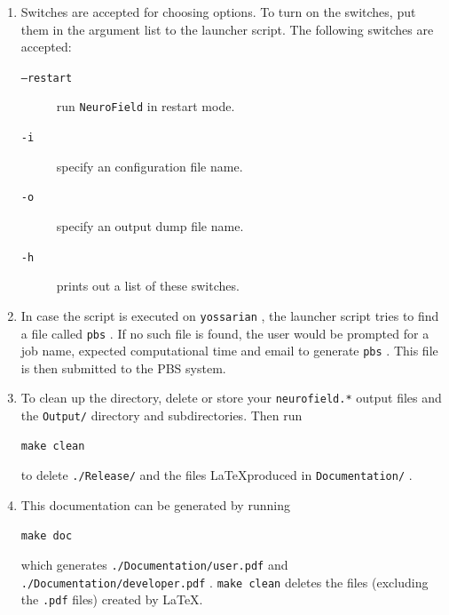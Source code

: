 \documentclass[12pt,a4paper]{article}
\newcommand{\type}[1]{ {\small\small\tt #1} }
\newcommand{\NF}[0]{ \type{NeuroField}}
\begin{document}
\begin{enumerate}
\item Switches are accepted for choosing options. To turn on the switches, put them in the argument list to the launcher script. The following switches are accepted:
	\begin{description}
	\item[\type{--restart}] run \NF in restart mode.
	\item[\type{-i}] specify an configuration file name.
	\item[\type{-o}] specify an output dump file name.
	\item[\type{-h}] prints out a list of these switches.
	\end{description}

\item In case the script is executed on \type{yossarian}, the launcher script tries to find a file called \type{pbs}. If no such file is found, the user would be prompted for a job name, expected computational time and email to generate \type{pbs}. This file is then submitted to the PBS system.

\item To clean up the directory, delete or store your \type{neurofield.*} output files and the \type{Output/} directory and subdirectories. Then run
\begin{lstlisting}
make clean
\end{lstlisting}
to delete \type{./Release/} and the files \LaTeX produced in \type{Documentation/}.

\item This documentation can be generated by running 
\begin{lstlisting}
make doc
\end{lstlisting}
which generates \type{./Documentation/user.pdf} and \type{./Documentation/developer.pdf}. \type{make clean} deletes the files (excluding the \type{.pdf} files) created by \LaTeX.

\end{enumerate}


\end{document}
